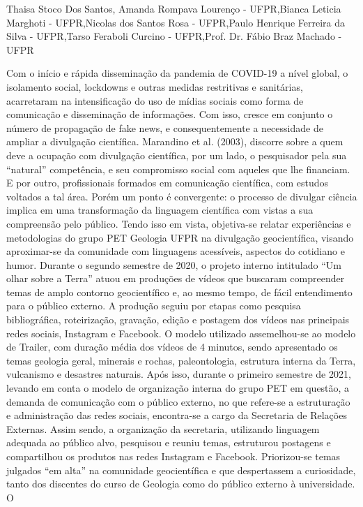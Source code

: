 Thaisa Stoco Dos Santos, Amanda Rompava Lourenço - UFPR,Bianca Leticia Marghoti - UFPR,Nicolas dos Santos Rosa - UFPR,Paulo Henrique Ferreira da Silva - UFPR,Tarso Feraboli Curcino - UFPR,Prof. Dr. Fábio Braz Machado - UFPR

Com o início e rápida disseminação da pandemia de COVID-19 a nível global, o isolamento
social, lockdowns e outras medidas restritivas e sanitárias, acarretaram na intensificação do uso
de mídias sociais como forma de comunicação e disseminação de informações. Com isso, cresce
em conjunto o número de propagação de fake news, e consequentemente a necessidade de
ampliar a divulgação científica. Marandino et al. (2003), discorre sobre a quem deve a ocupação
com divulgação científica, por um lado, o pesquisador pela sua “natural” competência, e seu
compromisso social com aqueles que lhe financiam. E por outro, profissionais formados em
comunicação científica, com estudos voltados a tal área. Porém um ponto é convergente: o
processo de divulgar ciência implica em uma transformação da linguagem científica com vistas a
sua compreensão pelo público. Tendo isso em vista, objetiva-se relatar experiências e
metodologias do grupo PET Geologia UFPR na divulgação geocientífica, visando aproximar-se
da comunidade com linguagens acessíveis, aspectos do cotidiano e humor. Durante o segundo
semestre de 2020, o projeto interno intitulado “Um olhar sobre a Terra” atuou em produções de
vídeos que buscaram compreender temas de amplo contorno geocientífico e, ao mesmo tempo,
de fácil entendimento para o público externo. A produção seguiu por etapas como pesquisa
bibliográfica, roteirização, gravação, edição e postagem dos vídeos nas principais redes sociais,
Instagram e Facebook. O modelo utilizado assemelhou-se ao modelo de Trailer, com duração
média dos vídeos de 4 minutos, sendo apresentado os temas geologia geral, minerais e rochas,
paleontologia, estrutura interna da Terra, vulcanismo e desastres naturais. Após isso, durante o
primeiro semestre de 2021, levando em conta o modelo de organização interna do grupo PET em
questão, a demanda de comunicação com o público externo, no que refere-se a estruturação e
administração das redes sociais, encontra-se a cargo da Secretaria de Relações Externas. Assim
sendo, a organização da secretaria, utilizando linguagem adequada ao público alvo, pesquisou e
reuniu temas, estruturou postagens e compartilhou os produtos nas redes Instagram e Facebook.
Priorizou-se temas julgados “em alta” na comunidade geocientífica e que despertassem a
curiosidade, tanto dos discentes do curso de Geologia como do público externo à universidade. O
